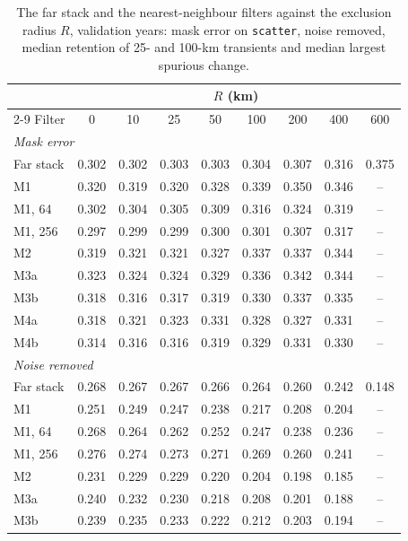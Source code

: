 \documentclass[preprint,12pt,authoryear]{elsarticle}
\begin{document}
\begin{table}[tbp]
  \centering
  \scriptsize\renewcommand{\arraystretch}{0.95}
  \caption{The far stack and the nearest-neighbour filters against the exclusion radius $R$, validation years: mask error on \texttt{scatter}, noise removed, median retention of 25- and 100-km transients and median largest spurious change.}
  \label{tab:radius}
  \setlength{\tabcolsep}{4pt}
  \begin{tabular}{lcccccccc}
    \toprule
    & \multicolumn{8}{c}{$R$ (km)} \\
    \cmidrule(lr){2-9}
    Filter & 0 & 10 & 25 & 50 & 100 & 200 & 400 & 600 \\
    \midrule
    \multicolumn{9}{l}{\textit{Mask error}} \\
    Far stack & 0.302 & 0.302 & 0.303 & 0.303 & 0.304 & 0.307 & 0.316 & 0.375 \\
    M1 & 0.320 & 0.319 & 0.320 & 0.328 & 0.339 & 0.350 & 0.346 & -- \\
    M1, 64 & 0.302 & 0.304 & 0.305 & 0.309 & 0.316 & 0.324 & 0.319 & -- \\
    M1, 256 & 0.297 & 0.299 & 0.299 & 0.300 & 0.301 & 0.307 & 0.317 & -- \\
    M2 & 0.319 & 0.321 & 0.321 & 0.327 & 0.337 & 0.337 & 0.344 & -- \\
    M3a & 0.323 & 0.324 & 0.324 & 0.329 & 0.336 & 0.342 & 0.344 & -- \\
    M3b & 0.318 & 0.316 & 0.317 & 0.319 & 0.330 & 0.337 & 0.335 & -- \\
    M4a & 0.318 & 0.321 & 0.323 & 0.331 & 0.328 & 0.327 & 0.331 & -- \\
    M4b & 0.314 & 0.316 & 0.316 & 0.319 & 0.329 & 0.331 & 0.330 & -- \\
    \multicolumn{9}{l}{\textit{Noise removed}} \\
    Far stack & 0.268 & 0.267 & 0.267 & 0.266 & 0.264 & 0.260 & 0.242 & 0.148 \\
    M1 & 0.251 & 0.249 & 0.247 & 0.238 & 0.217 & 0.208 & 0.204 & -- \\
    M1, 64 & 0.268 & 0.264 & 0.262 & 0.252 & 0.247 & 0.238 & 0.236 & -- \\
    M1, 256 & 0.276 & 0.274 & 0.273 & 0.271 & 0.269 & 0.260 & 0.241 & -- \\
    M2 & 0.231 & 0.229 & 0.229 & 0.220 & 0.204 & 0.198 & 0.185 & -- \\
    M3a & 0.240 & 0.232 & 0.230 & 0.218 & 0.208 & 0.201 & 0.188 & -- \\
    M3b & 0.239 & 0.235 & 0.233 & 0.222 & 0.212 & 0.203 & 0.194 & -- \\

\end{tabular}
\end{table}
\end{document}
